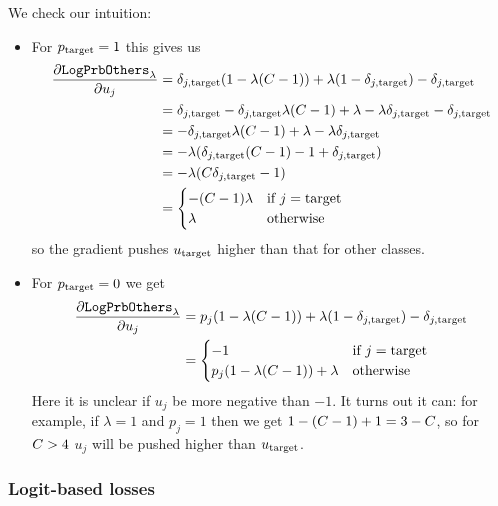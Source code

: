 \documentclass[../main.tex]{subfiles}
\begin{document}
We check our intuition:
\begin{itemize}
    \item For $p_{\mathrm{target}} = 1$ this gives us
          \begin{align*}
              \frac{\partial \mathtt{LogPrbOthers}_{\lambda}}{\partial u_j}
               & = \delta_{j, \mathrm{target}} (1 - \lambda (C - 1)) + \lambda (1 - \delta_{j, \mathrm{target}}) - \delta_{j, \mathrm{target}}      \\
               & = \delta_{j, \mathrm{target}} - \delta_{j, \mathrm{target}} \lambda (C - 1) + \lambda - \lambda \delta_{j, \mathrm{target}} - \delta_{j, \mathrm{target}} \\
               & = - \delta_{j, \mathrm{target}} \lambda (C - 1) + \lambda - \lambda \delta_{j, \mathrm{target}}             \\
               & = - \lambda (\delta_{j, \mathrm{target}} (C - 1) - 1 + \delta_{j, \mathrm{target}})                         \\
               & = - \lambda (C \delta_{j, \mathrm{target}} - 1)                                      \\
               & = \begin{cases}
                       - (C - 1) \lambda & \text{if } j = \mathrm{target} \\
                       \lambda                    & \text{otherwise}
                   \end{cases}
          \end{align*}
          so the gradient pushes $u_{\mathrm{target}}$ higher than that for other classes.

    \item For $p_{\mathrm{target}} = 0$ we get
          \begin{align*}
              \frac{\partial \mathtt{LogPrbOthers}_{\lambda}}{\partial u_j}
               & = p_j (1 - \lambda (C - 1)) + \lambda (1 - \delta_{j, \mathrm{target}}) - \delta_{j, \mathrm{target}}        \\
               & = \begin{cases}
                       -1                                           & \text{if } j = \mathrm{target} \\
                       p_j(1 - \lambda ( C -1 )) + \lambda & \text{otherwise}
                   \end{cases}
          \end{align*}
Here it is unclear if $u_j$ be more negative than $-1$.
It turns out it can: for example, if $\lambda = 1$ and $p_j = 1$ then we get $1 - (C -1) + 1 = 3 - C$, so for $C > 4$ $u_j$ will be pushed higher than $u_{\mathrm{target}}$.
\end{itemize}


\subsubsection{Logit-based losses}
\end{document}
